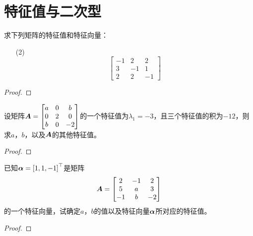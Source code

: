 \section{特征值与二次型}

\begin{problem}
求下列矩阵的特征值和特征向量：
\begin{enumerate}
    \item[(2)]{
                \begin{equation*}
                    \begin{bmatrix}
                        -1 & 2  & 2  \\
                        3  & -1 & 1  \\
                        2  & 2  & -1
                    \end{bmatrix}
                \end{equation*}
          }
\end{enumerate}
\end{problem}
\begin{proof}

\end{proof}

\begin{problem}
设矩阵\(\boldsymbol{A}=\begin{bmatrix}a&0&b\\0&2&0\\b&0&-2\end{bmatrix}\)的一个特征值为\(\lambda_1=-3\)，且三个特征值的积为\(-12\)，则求\(a\)，\(b\)，以及\(\boldsymbol{A}\)的其他特征值。
\end{problem}
\begin{proof}

\end{proof}

\begin{problem}
已知\(\boldsymbol{\alpha}=\left[ 1,1,-1 \right]^\top\)是矩阵
\begin{equation*}
    \boldsymbol{A}=
    \begin{bmatrix}
        2  & -1 & 2  \\
        5  & a  & 3  \\
        -1 & b  & -2
    \end{bmatrix}
\end{equation*}
的一个特征向量，试确定\(a\)，\(b\)的值以及特征向量\(\boldsymbol{\alpha}\)所对应的特征值。
\end{problem}
\begin{proof}

\end{proof}

